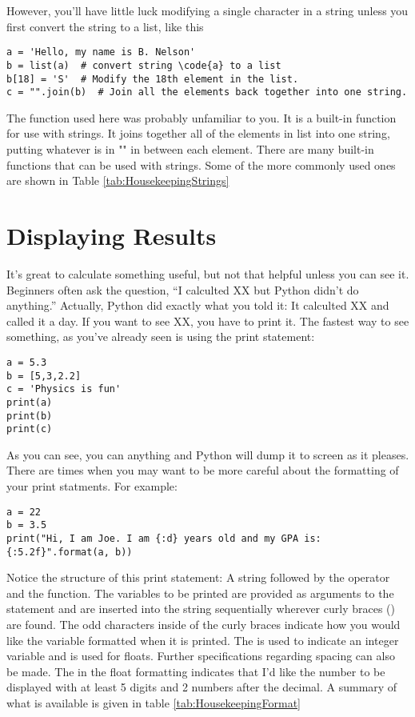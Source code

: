  However, you'll have little luck modifying a single character in a
string unless you first convert the string to a list, like this
\begin{Verbatim}
a = 'Hello, my name is B. Nelson'
b = list(a)  # convert string \code{a} to a list
b[18] = 'S'  # Modify the 18th element in the list.
c = "".join(b)  # Join all the elements back together into one string.
\end{Verbatim}
The  function used here was probably unfamiliar to you.
It is a built-in function for use with strings.  It joins together all
of the elements in list  into one string, putting whatever
is in "" in between
each element.  There are many built-in functions that can be used with
strings.  Some of the more commonly used ones are shown in Table \ref{tab:HousekeepingStrings}
\section{Displaying Results}
It's great to calculate something useful, but not that helpful unless
you can see it.  Beginners often ask the question, ``I calculted XX
but Python didn't do anything.''  Actually, Python did exactly what
you told it:  It calculted XX and called it a day.  If you want to see
XX, you have to print it.   The fastest way to see something, as
you've already seen is using the print statement:
\begin{Verbatim}
a = 5.3
b = [5,3,2.2]
c = 'Physics is fun'
print(a)
print(b)
print(c)
\end{Verbatim}
As you can see, you can  anything and Python will dump
it to screen as it pleases.  There are times when you may want to be
more careful about the formatting of your print statments.  For
example:
\begin{Verbatim}
a = 22
b = 3.5
print("Hi, I am Joe. I am {:d} years old and my GPA is: {:5.2f}".format(a, b))
\end{Verbatim}
Notice the structure of this print statement: A string followed by the
 operator and the  function. The variables to
be printed are provided as arguments to the  statement
and are inserted into the string sequentially wherever curly braces
(\code{\{\}}) are found.
 The odd characters inside of the curly braces indicate how you would
 like the variable formatted when it is printed. The  is
 used to indicate an integer variable and  is used for
 floats.  Further specifications regarding spacing can also be made.
 The  in the float formatting indicates that I'd like the
 number to be displayed with at least 5 digits and 2 numbers after the
 decimal.  A
 summary of what is available is given in table \ref{tab:HousekeepingFormat}


